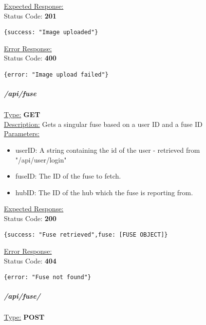 \documentclass[draft,preprint,12pt,3p]{elsarticle}
\newcommand{\forceindent}{\leavevmode{\parindent=1em\indent}}
\begin{document}
\underline{Expected Response:}\\[5pt]
\forceindent Status Code: \textbf{201} \\
\begin{verbatim}
{success: "Image uploaded"}
\end{verbatim}
\underline{Error Response:}\\[5pt]
\forceindent Status Code: \textbf{400} \\
\begin{verbatim}
{error: "Image upload failed"}
\end{verbatim}

\subparagraph*{/api/fuse}
\underline{Type:} \textbf{GET}\\

\underline{Description:} Gets a singular fuse based on a user ID and a fuse ID\\

\underline{Parameters:}
\begin{itemize}
\item userID: A string containing the id of the user - retrieved from "/api/user/login"

\item fuseID: The ID of the fuse to fetch.

\item hubID: The ID of the hub which the fuse is reporting from.

\end{itemize}

\underline{Expected Response:}\\[5pt]
\forceindent Status Code: \textbf{200} \\
\begin{verbatim}
{success: "Fuse retrieved",fuse: [FUSE OBJECT]}
\end{verbatim}
\underline{Error Response:}\\[5pt]
\forceindent Status Code: \textbf{404} \\
\begin{verbatim}
{error: "Fuse not found"}
\end{verbatim}

\subparagraph*{/api/fuse/}
\underline{Type:} \textbf{POST}\\
\end{document}
